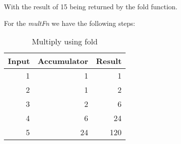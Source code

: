 With the result of 15 being returned by the fold function.

For the \emph{multFn} we have the following steps:

\begin{table}[!h]
\centering
\begin{tabular} { | r | r | r  | }
\hline
Input  & Accumulator & Result   \\
\hline
1 & 1 & 1 \\
2 & 1 & 2 \\
3 & 2 & 6 \\
4 & 6 & 24 \\
5 & 24 & 120 \\
\hline
\end{tabular}
\caption{Multiply using fold}
\end{table}
